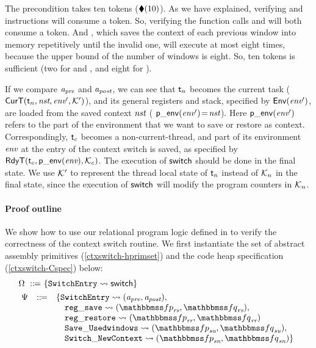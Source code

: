 The precondition takes ten tokens ($\blacklozenge({10})$).
As we have explained, verifying \call{}
and \jmp{} instructions will consume a token.
So, verifying the function calls
\regsave{} and \regrestore{} will
both consume a token. And \SaveUsedWin{},
which saves the context of each previous window
into memory repetitively until the invalid one,
will execute at most eight times,
because the upper bound of
the number of windows is eight.
So, ten tokens is sufficient (two for \regsave{} and
\regrestore{}, and eight for \SaveUsedWin{}).

If we compare $\textit{a}_\textit{pre}$ and $\textit{a}_\textit{post}$, we can see that
$\textsf{t}_n$ becomes the current task
($\textsf{CurT}({\textsf{t}_n}, {\textit{nst}}, {\textit{env}'}, {\mathcal{K}'})$),
and its general registers and stack, specified by
$\mathsf{Env}({\textit{env}'})$, are loaded from the saved context
$\textit{nst}$ (\ie{} $\mathsf{p\_env}({\textit{env}'})\!=\!\textit{nst}$).
Here $\mathsf{p\_env}({\textit{env}'})$ refers to the part of the environment
that we want to save or restore as context.
Correspondingly, $\textsf{t}_c$ becomes a non-current-thread,
and part of its environment $\textit{env}$ at the entry of
the context switch is saved, as specified by
$\textsf{RdyT}({\textsf{t}_c}, {\mathsf{p\_env}({\textit{env}})}, {\mathcal{K}_c})$.
The execution of $\mathsf{switch}$ should be done in the final state.
We use $\mathcal{K}'$ to represent the thread local
state of $\textsf{t}_n$ instead of $\mathcal{K}_n$
in the final state, since the execution of
$\mathsf{switch}$ will modify the program counters
in $\mathcal{K}_n$.

\paragraph{\textbf{Proof outline}} We show how to use
our relational program logic defined in
\Fig{\ref{fig:Selected Inference Rules for Refinement Verification}}
to verify the correctness of the context switch routine.
We first instantiate the set of
abstract assembly primitives (\ref{ctxswitch-hprimset})
and the code heap specification (\ref{ctxswitch-Cspec})
below:
\begin{align}
    & \hprimset \ \define \ \{ \SwitchEntry \leadsto
        \primsw \}
        \label{ctxswitch-hprimset} \\
    & \!\begin{array}{lcl}
        \Cspec & \define &
        \{ \SwitchEntry \leadsto (\Apre, \Apost), \\
        & & \quad
        \regsave \leadsto
        (\relspecpre_{\textit{rs}}, \relspecpost_{\textit{rs}}),\\
        & & \quad
        \regrestore \leadsto
        (\relspecpre_{\textit{rr}}, \relspecpost_{\textit{rr}}) \\
        & & \quad
        \SaveUsedWin{} \leadsto (\relspecpre_{\textit{su}}, \relspecpost_{\textit{su}}), \\
        & & \quad
        \SwitchNewTask{} \leadsto (\relspecpre_{\textit{sn}}, \relspecpost_{\textit{sn}})
        \}
        \label{ctxswitch-Cspec}
    \end{array}
\end{align}

